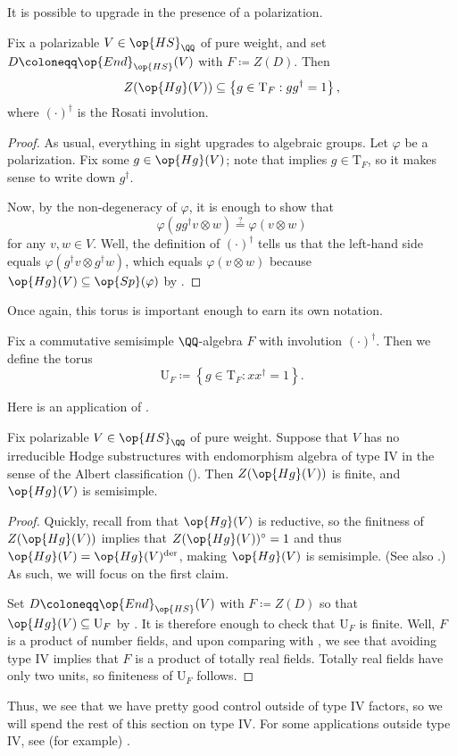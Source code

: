 \documentclass[../thesis.tex]{subfiles}
\begin{document}
It is possible to upgrade  in the presence of a polarization.
\begin{lemma} \label{lem:hg-center-in-u-torus}
	Fix a polarizable $V\in\op{HS}_\QQ$ of pure weight, and set $D\coloneqq\op{End}_{\op{HS}}(V)$ with $F\coloneqq Z(D)$. Then
	\[Z(\op{Hg}(V))\subseteq\left\{g\in\mathrm T_F:gg^\dagger=1\right\},\]
	where $(\cdot)^\dagger$ is the Rosati involution.
\end{lemma}
\begin{proof}
	As usual, everything in sight upgrades to algebraic groups. Let $\varphi$ be a polarization. Fix some $g\in\op{Hg}(V)$; note that  implies $g\in\mathrm T_F$, so it makes sense to write down $g^\dagger$.
	
	Now, by the non-degeneracy of $\varphi$, it is enough to show that
	\[\varphi\left(gg^\dagger v\otimes w\right)\stackrel?=\varphi(v\otimes w)\]
	for any $v,w\in V$. Well, the definition of $(\cdot)^\dagger$ tells us that the left-hand side equals $\varphi\left(g^\dagger v\otimes g^\dagger w\right)$, which equals $\varphi(v\otimes w)$ because $\op{Hg}(V)\subseteq\op{Sp}(\varphi)$ by .
\end{proof}
Once again, this torus is important enough to earn its own notation.
\begin{notation}
	Fix a commutative semisimple $\QQ$-algebra $F$ with involution $(\cdot)^\dagger$. Then we define the torus
	\[\mathrm U_F\coloneqq\left\{g\in\mathrm T_F:xx^\dagger=1\right\}.\]
\end{notation}
Here is an application of .
\begin{proposition} \label{prop:hodge-semisimple-not-type-iv}
	Fix polarizable $V\in\op{HS}_\QQ$ of pure weight. Suppose that $V$ has no irreducible Hodge substructures with endomorphism algebra of type IV in the sense of the Albert classification (). Then $Z(\op{Hg}(V))$ is finite, and $\op{Hg}(V)$ is semisimple.
\end{proposition}
\begin{proof}
	Quickly, recall from  that $\op{Hg}(V)$ is reductive, so the finitness of $Z(\op{Hg}(V))$ implies that $Z(\op{Hg}(V))^\circ=1$ and thus $\op{Hg}(V)=\op{Hg}(V)^{\mathrm{der}}$, making $\op{Hg}(V)$ is semisimple. (See also \cite[Proposition~19.10]{milne-alg-groups}.) As such, we will focus on the first claim.
	
	Set $D\coloneqq\op{End}_{\op{HS}}(V)$ with $F\coloneqq Z(D)$ so that $\op{Hg}(V)\subseteq\mathrm U_F$ by . It is therefore enough to check that $\mathrm U_F$ is finite. Well, $F$ is a product of number fields, and upon comparing with , we see that avoiding type IV implies that $F$ is a product of totally real fields. Totally real fields have only two units, so finiteness of $\mathrm U_F$ follows.
\end{proof}
Thus, we see that we have pretty good control outside of type IV factors, so we will spend the rest of this section on type IV. For some applications outside type IV, see (for example) \cite{lombardo-ell-adic-product}.
\end{document}
